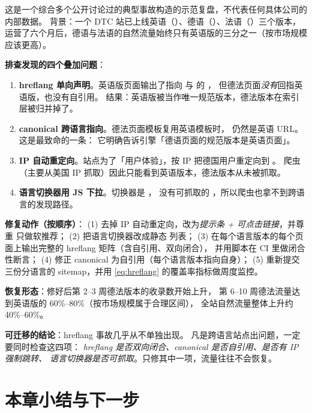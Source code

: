 \begin{casebox}
这是一个综合多个公开讨论过的典型事故构造的示范复盘，不代表任何具体公司的内部数据。
背景：一个 DTC 站已上线英语（）、德语（）、法语（）三个版本，
运营了六个月后，德语与法语的自然流量始终只有英语版的三分之一（按市场规模应该更高）。

\textbf{排查发现的四个叠加问题}：
\begin{enumerate}
  \item \textbf{hreflang 单向声明}。英语版页面输出了指向  与  的 ，
        但德法页面\emph{没有}回指英语版，也没有自引用。
        结果：英语版被当作唯一规范版本，德法版本在索引层被归并掉了。
  \item \textbf{canonical 跨语言指向}。德法页面模板复用英语模板时，
         仍然是英语 URL。这是最致命的一条：
        它明确告诉引擎「德语页面的规范版本是英语页面」。
  \item \textbf{IP 自动重定向}。站点为了「用户体验」，按 IP 把德国用户重定向到 。
        爬虫（主要从美国 IP 抓取）因此只能看到英语版本，德法版本从未被抓取。
  \item \textbf{语言切换器用 JS 下拉}。切换器是 ，
        没有可抓取的 ，所以爬虫也拿不到跨语言的发现路径。
\end{enumerate}

\textbf{修复动作（按顺序）}：
(1) 去掉 IP 自动重定向，改为\emph{提示条 + 可点击链接}，并尊重  只做软推荐；
(2) 把语言切换器改成静态  列表；
(3) 在每个语言版本的每个页面上输出完整的 hreflang 矩阵（含自引用、双向闭合），
        并用脚本在 CI 里做闭合性断言；
(4) 修正 canonical 为自引用（每个语言版本指向自身）；
(5) 重新提交三份分语言的 sitemap，并用 \cref{eq:hreflang} 的覆盖率指标做周度监控。

\textbf{恢复形态}：修好后第 2--3 周德法版本的收录数开始上升，
第 6--10 周德法流量达到英语版的 60\%--80\%（按市场规模属于合理区间），
全站自然流量整体上升约 40\%--60\%。

\textbf{可迁移的结论}：hreflang 事故几乎从不单独出现。
凡是跨语言站点出问题，一定要同时检查这四项：
\emph{hreflang 是否双向闭合、canonical 是否自引用、是否有 IP 强制跳转、
语言切换器是否可抓取}。只修其中一项，流量往往不会恢复。
\end{casebox}

\section{本章小结与下一步}

